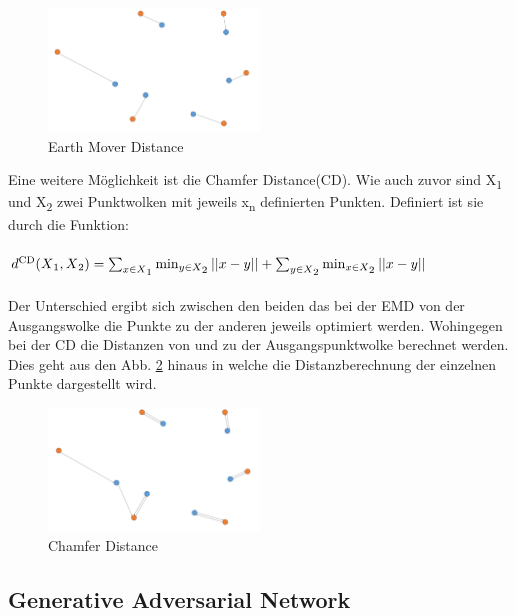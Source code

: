 \documentclass{llncs}
\begin{document}
	\begin{figure}[htbp] 
		\centering
		\includegraphics[width=0.5\textwidth]{emd.png}
		\caption{Earth Mover Distance}
		\label{fig:Bild9}
	\end{figure}

	Eine weitere Möglichkeit ist die Chamfer Distance(CD). Wie auch zuvor sind  X\textsubscript{1} und X\textsubscript{2} zwei Punktwolken mit jeweils x\textsubscript{n} definierten Punkten\cite{autoencoderloss}. Definiert ist sie durch die Funktion:
	\\\\
	\begin{math}
	d\textsuperscript{CD}(X\textsubscript{1},X\textsubscript{2})=\sum_{x\in X\textsubscript{1}} \min_{y \in X\textsubscript{2}}||x-y|| + \sum_{y\in X\textsubscript{2}} \min_{x \in X\textsubscript{2}}||x-y||
	\end{math}
	\\\\
	Der Unterschied ergibt sich zwischen den beiden das bei der EMD von der Ausgangswolke die Punkte zu der anderen jeweils optimiert werden. Wohingegen bei der CD die Distanzen von und zu der Ausgangspunktwolke berechnet werden. Dies geht aus den Abb. \ref{fig:Bild10} hinaus in welche die Distanzberechnung der einzelnen Punkte dargestellt wird\cite{autoencoderloss}.

	\begin{figure}[htbp] 
		\centering
		\includegraphics[width=0.5\textwidth]{chamfer.png}
		\caption{Chamfer Distance}
		\label{fig:Bild10}
	\end{figure} 


\subsection{Generative Adversarial Network}
\end{document}
